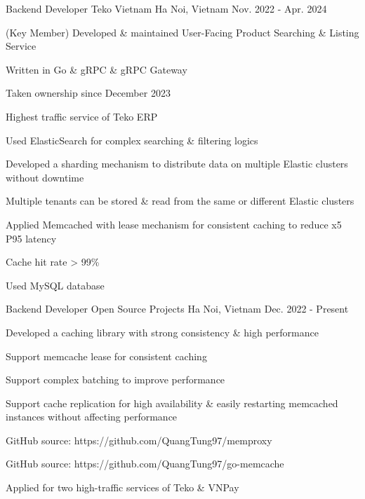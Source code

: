 \begin{cventries}
\cventry
{Backend Developer} %
{Teko Vietnam} %
{Ha Noi, Vietnam} %
{Nov. 2022 - Apr. 2024} %
{ %
\begin{cvitems}
\item{(Key Member) Developed \& maintained User-Facing Product Searching \& Listing Service}
\item{Written in Go \& gRPC \& gRPC Gateway}
\item{Taken ownership since December 2023}
\item{Highest traffic service of Teko ERP}
\item{Used ElasticSearch for complex searching \& filtering logics}
\item{Developed a sharding mechanism to distribute data on multiple Elastic clusters without downtime}
\item{Multiple tenants can be stored \& read from the same or different Elastic clusters}
\item{Applied Memcached with lease mechanism for consistent caching to reduce x5 P95 latency}
\item{Cache hit rate > 99\%}
\item{Used MySQL database}
\end{cvitems}
}


\cventry
{Backend Developer} %
{Open Source Projects} %
{Ha Noi, Vietnam} %
{Dec. 2022 - Present} %
{ %
\begin{cvitems}
\item{Developed a caching library with strong consistency \& high performance}
\item{Support memcache lease for consistent caching}
\item{Support complex batching to improve performance}
\item{Support cache replication for high availability \& easily restarting memcached instances without affecting performance}
\item{GitHub source: https://github.com/QuangTung97/memproxy}
\item{GitHub source: https://github.com/QuangTung97/go-memcache}
\item{Applied for two high-traffic services of Teko \& VNPay}
\end{cvitems}
}



\end{cventries}
